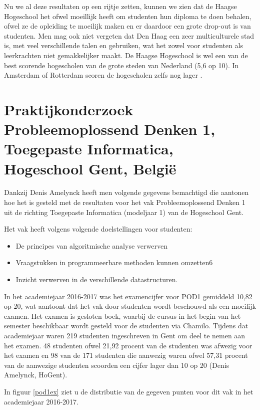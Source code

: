 Nu we al deze resultaten op een rijtje zetten, kunnen we zien dat de Haagse Hogeschool het ofwel moeillijk heeft om studenten hun diploma te doen behalen, ofwel ze de opleiding te moeilijk maken en er daardoor een grote drop-out is van studenten. Men mag ook niet vergeten dat Den Haag een zeer multiculturele stad is, met veel verschillende talen en gebruiken, wat het zowel voor studenten als leerkrachten niet gemakkelijker maakt. De Haagse Hogeschool is wel een van de best scorende hogescholen van de grote steden van Nederland (5,6 op 10). In Amsterdam of Rotterdam scoren de hogescholen zelfs nog lager \autocite{AD-PeterKoop2017}.

\newpage
\section{Praktijkonderzoek Probleemoplossend Denken 1, Toegepaste Informatica, Hogeschool Gent, België}
\label{sec:pod1gent}

Dankzij Denis Amelynck heeft men volgende gegevens bemachtigd die aantonen hoe het is gesteld met de resultaten voor het vak Probleemoplossend Denken 1 uit de richting Toegepaste Informatica (modeljaar 1) van de Hogeschool Gent.

Het vak heeft volgens \textcite{Studiegids2017} volgende doelstellingen voor studenten:
\begin{itemize}
	\item De principes van algoritmische analyse verwerven
	\item Vraagstukken in programmeerbare methoden kunnen omzetten6
	\item Inzicht verwerven in de verschillende datastructuren.
\end{itemize}

In het academiejaar 2016-2017 was het examencijfer voor POD1 gemiddeld 10,82 op 20, wat aantoont dat het vak door studenten wordt beschouwd als een moeilijk examen. Het examen is gesloten boek, waarbij de cursus in het begin van het semester beschikbaar wordt gesteld voor de studenten via Chamilo. Tijdens dat academiejaar waren 219 studenten ingeschreven in Gent om deel te nemen aan het examen. 48 studenten ofwel 21,92 procent van de studenten was afwezig voor het examen en 98 van de 171 studenten die aanwezig waren ofwel 57,31 procent van de aanwezige studenten scoorden een cijfer lager dan 10 op 20 (Denis Amelynck, HoGent).

In figuur \ref{pod1ex} ziet u de distributie van de gegeven punten voor dit vak in het academiejaar 2016-2017.

